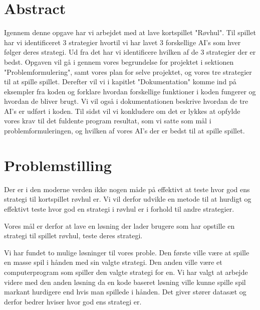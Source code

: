 \documentclass[a4paper, 12pt]{article}
\begin{document}
\begin{multicols}{2}

\section{Abstract}

Igennem denne opgave har vi arbejdet med at lave kortspillet "Røvhul". Til spillet har vi identificeret 3 strategier hvortil vi har lavet 3 forskellige AI’s som hver følger deres strategi. Ud fra det har vi identificere hvilken af de 3 strategier der er bedst. Opgaven vil gå i gennem vores begrundelse for projektet i sektionen "Problemformulering", samt vores plan for selve projektet, og vores tre strategier til at spille spillet.
\bigbreak
Derefter vil vi i kapitlet "Dokumentation" komme ind på eksempler fra koden og forklare hvordan forskellige funktioner i koden fungerer og hvordan de bliver brugt. Vi vil også i dokumentationen beskrive hvordan de tre AI's er udført i koden. 
\bigbreak
Til sidst vil vi konkludere om det er lykkes at opfylde vores krav til det fuldente program resultat, som vi satte som mål i problemformuleringen, og hvilken af vores AI's der er bedst til at spille spillet.

\section{Problemstilling}

Der er i den moderne verden ikke nogen måde på effektivt at teste hvor god ens strategi til kortspillet røvhul er. Vi vil derfor udvikle en metode til at hurdigt og effektivt teste hvor god en strategi i røvhul er i forhold til andre strategier.

Vores mål er derfor at lave en løsning der lader brugere som har opstille en strategi til spillet røvhul, teste deres strategi.



Vi har fundet to mulige løsninger til vores proble. Den første ville være at spille en masse spil i hånden med sin valgte strategi. Den anden ville være et computerprogram som spiller den valgte strategi for en. Vi har valgt at arbejde videre med den anden løsning da en kode baseret løsning ville kunne spille spil markant hurdigere end hvis man spillede i hånden. Det giver stører datasæt og derfor bedrer hviser hvor god ens strategi er.


\end{multicols}
\end{document}
